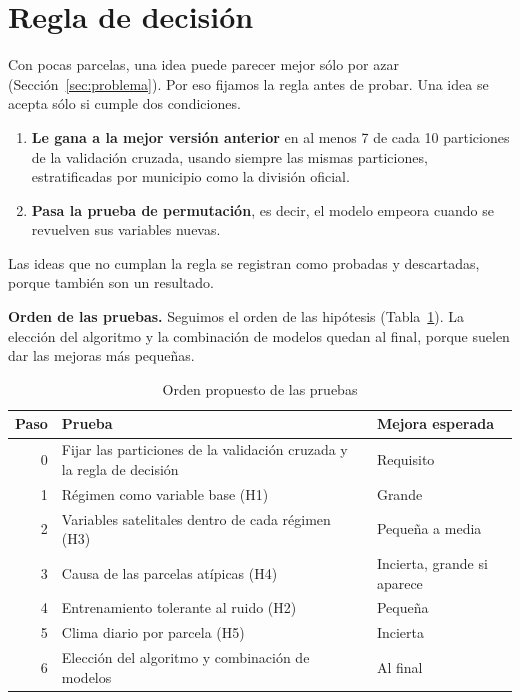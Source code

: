 \section{Regla de decisión}\label{sec:decision}
Con pocas parcelas, una idea puede parecer mejor sólo por azar (Sección~\ref{sec:problema}). Por eso fijamos la
regla antes de probar. Una idea se acepta sólo si cumple dos condiciones.
\begin{enumerate}
  \item \textbf{Le gana a la mejor versión anterior} en al menos 7 de cada 10 particiones de la validación cruzada,
        usando siempre las mismas particiones, estratificadas por municipio como la división oficial.
  \item \textbf{Pasa la prueba de permutación}, es decir, el modelo empeora cuando se revuelven sus variables nuevas.
\end{enumerate}
Las ideas que no cumplan la regla se registran como probadas y descartadas, porque también son un resultado.

\textbf{Orden de las pruebas.} Seguimos el orden de las hipótesis (Tabla~\ref{tab:orden}). La elección del algoritmo
y la combinación de modelos quedan al final, porque suelen dar las mejoras más pequeñas.

\begin{table}[!t]
\caption{Orden propuesto de las pruebas}\label{tab:orden}
\centering\footnotesize
\begin{tabularx}{\columnwidth}{@{}rX>{\raggedright\arraybackslash}p{2.1cm}@{}}
\toprule
Paso & Prueba & Mejora esperada \\
\midrule
0 & Fijar las particiones de la validación cruzada y la regla de decisión & Requisito \\
1 & Régimen como variable base (H1) & Grande \\
2 & Variables satelitales dentro de cada régimen (H3) & Pequeña a media \\
3 & Causa de las parcelas atípicas (H4) & Incierta, grande si aparece \\
4 & Entrenamiento tolerante al ruido (H2) & Pequeña \\
5 & Clima diario por parcela (H5) & Incierta \\
6 & Elección del algoritmo y combinación de modelos & Al final \\
\bottomrule
\end{tabularx}
\end{table}

